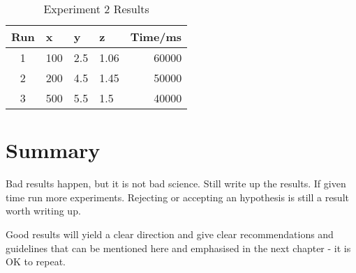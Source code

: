\begin{table}
	\centering
	\begin{tabular}{|c|l|l|l||r|}\hline
	Run	&	x	&	y 	&	z	& Time/ms\\ \hline
	1	&	100	&	2.5	& 	1.06	& 60000 \\ \hline
	2	&	200	&	4.5	&	1.45	& 50000 \\ \hline
	3	&	500	&	5.5	&	1.5	& 40000 \\ \hline
	\end{tabular}
	\caption{Experiment 2 Results}
	\label{ta:ex2}
\end{table}




\section{Summary}
Bad results happen, but it is not bad science. Still write up the results. If given time run more experiments. Rejecting or accepting an hypothesis is still a result worth writing up.

Good results will yield a clear direction and give clear recommendations and guidelines that can be mentioned here and emphasised in the next chapter \-- it is OK to repeat.


